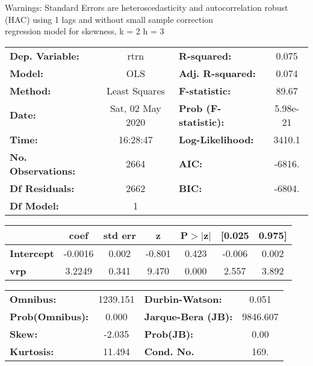 Warnings: \newline
 [1] Standard Errors are heteroscedasticity and autocorrelation robust (HAC) using 1 lags and without small sample correction\\ 

regression model for skewness, k = 2 h = 3\begin{center}
\begin{tabular}{lclc}
\toprule
\textbf{Dep. Variable:}    &       rtrn       & \textbf{  R-squared:         } &     0.075   \\
\textbf{Model:}            &       OLS        & \textbf{  Adj. R-squared:    } &     0.074   \\
\textbf{Method:}           &  Least Squares   & \textbf{  F-statistic:       } &     89.67   \\
\textbf{Date:}             & Sat, 02 May 2020 & \textbf{  Prob (F-statistic):} &  5.98e-21   \\
\textbf{Time:}             &     16:28:47     & \textbf{  Log-Likelihood:    } &    3410.1   \\
\textbf{No. Observations:} &        2664      & \textbf{  AIC:               } &    -6816.   \\
\textbf{Df Residuals:}     &        2662      & \textbf{  BIC:               } &    -6804.   \\
\textbf{Df Model:}         &           1      & \textbf{                     } &             \\
\bottomrule
\end{tabular}
\begin{tabular}{lcccccc}
                   & \textbf{coef} & \textbf{std err} & \textbf{z} & \textbf{P$> |$z$|$} & \textbf{[0.025} & \textbf{0.975]}  \\
\midrule
\textbf{Intercept} &      -0.0016  &        0.002     &    -0.801  &         0.423        &       -0.006    &        0.002     \\
\textbf{vrp}       &       3.2249  &        0.341     &     9.470  &         0.000        &        2.557    &        3.892     \\
\bottomrule
\end{tabular}
\begin{tabular}{lclc}
\textbf{Omnibus:}       & 1239.151 & \textbf{  Durbin-Watson:     } &    0.051  \\
\textbf{Prob(Omnibus):} &   0.000  & \textbf{  Jarque-Bera (JB):  } & 9846.607  \\
\textbf{Skew:}          &  -2.035  & \textbf{  Prob(JB):          } &     0.00  \\
\textbf{Kurtosis:}      &  11.494  & \textbf{  Cond. No.          } &     169.  \\
\bottomrule
\end{tabular}
\end{center}

